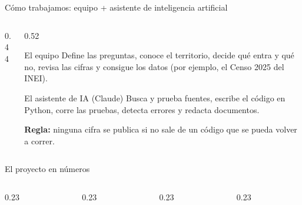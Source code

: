 \documentclass[aspectratio=169,11pt]{beamer}
\begin{document}
\begin{frame}{Cómo trabajamos: equipo + asistente de inteligencia artificial}
\begin{columns}[c]
\begin{column}{0.44\textwidth}\centering
{}
\end{column}
\begin{column}{0.52\textwidth}
\begin{caja}{El equipo}
Define las preguntas, conoce el territorio, decide qué entra y qué no, revisa las cifras y consigue los datos (por ejemplo, el Censo 2025 del INEI).
\end{caja}
\begin{caja}[naranja]{El asistente de IA (Claude)}
Busca y prueba fuentes, escribe el código en Python, corre las pruebas, detecta errores y redacta documentos.
\end{caja}
\small\textbf{Regla:} ninguna cifra se publica si no sale de un código que se pueda volver a correr.
\end{column}
\end{columns}
\end{frame}

\begin{frame}{El proyecto en números}
\begin{columns}[T]
\begin{column}{0.23\textwidth}\end{column}
\begin{column}{0.23\textwidth}\end{column}
\begin{column}{0.23\textwidth}\end{column}
\begin{column}{0.23\textwidth}\end{column}
\end{columns}
\end{frame}
\end{document}
